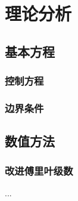 \chapter{理论分析}

\section{基本方程}
\subsection{控制方程}
\subsection{边界条件}

\section{数值方法}
\subsection{改进傅里叶级数}
...